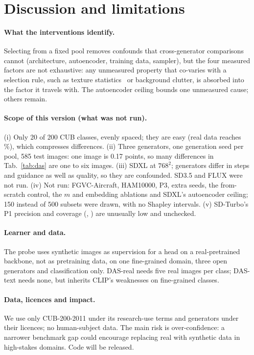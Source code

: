 \documentclass[10pt,twocolumn,letterpaper]{article}
\begin{document}
\section{Discussion and limitations}\label{sec:limits}
\paragraph{What the interventions identify.} Selecting from a fixed pool removes confounds that cross-generator comparisons cannot (architecture, autoencoder, training data, sampler), but the four measured factors are not exhaustive: any unmeasured property that co-varies with a selection rule, such as texture statistics~\cite{adamkiewicz2026pretty} or background clutter, is absorbed into the factor it travels with. The autoencoder ceiling bounds one unmeasured cause; others remain.

\paragraph{Scope of this version (what was not run).} (i) Only 20 of 200 CUB classes, evenly spaced; they are easy (real data reaches \RealN\%), which compresses differences. (ii) Three generators, one generation seed per pool, 585 test images: one image is 0.17 points, so many differences in Tab.~\ref{tab:das} are one to six images. (iii) SDXL at $768^2$; generators differ in steps and guidance as well as quality, so they are confounded. SD3.5 and FLUX were not run. (iv) Not run: FGVC-Aircraft, HAM10000, P3, extra seeds, the from-scratch control, the $m$ and embedding ablations and SDXL's autoencoder ceiling; 150 instead of 500 subsets were drawn, with no Shapley intervals. (v) SD-Turbo's P1 precision and coverage (\precBa, \covBa) are unusually low and unchecked.

\paragraph{Learner and data.} The probe uses synthetic images as supervision for a head on a real-pretrained backbone, not as pretraining data, on one fine-grained domain, three open generators and classification only. DAS-real needs five real images per class; DAS-text needs none, but inherits CLIP's weaknesses on fine-grained classes.


\paragraph{Data, licences and impact.} We use only CUB-200-2011 under its research-use terms and generators under their licences; no human-subject data. The main risk is over-confidence: a narrower benchmark gap could encourage replacing real with synthetic data in high-stakes domains. Code will be released.
\end{document}
